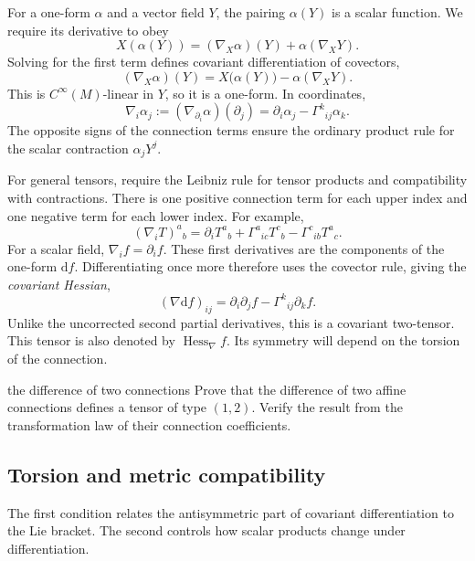 \documentclass[11pt,a4paper]{article}
\numberwithin{equation}{section}
\newcommand{\dd}{\mathrm d}
\newcommand{\Cinf}{C^\infty}
\begin{document}
For a one-form \(\alpha\) and a vector field \(Y\), the pairing
\(\alpha(Y)\) is a scalar function. We require its derivative to obey
\[
 X(\alpha(Y))=(\nabla_X\alpha)(Y)+\alpha(\nabla_XY).
\]
Solving for the first term defines covariant differentiation of covectors,
\[
 (\nabla_X\alpha)(Y)
 =X\bigl(\alpha(Y)\bigr)-\alpha(\nabla_XY).
\]
This is \(\Cinf(M)\)-linear in \(Y\), so it is a one-form. In coordinates,
\begin{equation}
 \nabla_i\alpha_j:=
 (\nabla_{\partial_i}\alpha)(\partial_j)
 =\partial_i\alpha_j-\Gamma^k{}_{ij}\alpha_k.
 \label{eq:covariant-covector}
\end{equation}
The opposite signs of the connection terms ensure the ordinary product rule
for the scalar contraction \(\alpha_jY^j\).

For general tensors, require the Leibniz rule for tensor products and
compatibility with contractions. There is one positive connection term for
each upper index and one negative term for each lower index. For example,
\[
 (\nabla_i T)^a{}_b
 =\partial_iT^a{}_b+\Gamma^a{}_{ic}T^c{}_b
  -\Gamma^c{}_{ib}T^a{}_c.
\]
For a scalar field, \(\nabla_i f=\partial_i f\). These first derivatives
are the components of the one-form \(\dd f\). Differentiating once more
therefore uses the covector rule, giving the \emph{covariant Hessian},
\begin{equation}
 (\nabla\dd f)_{ij}
 =\partial_i\partial_j f-\Gamma^k{}_{ij}\partial_k f.
 \label{eq:hessian}
\end{equation}
Unlike the uncorrected second partial derivatives, this is a covariant
two-tensor. This tensor is also denoted by \(\operatorname{Hess}_\nabla f\).
Its symmetry will depend on the torsion of the connection.


\begin{studentwork}[3.6cm]{the difference of two connections}
Prove that the difference of two affine connections defines a tensor
of type \((1,2)\). Verify the result from the transformation law of
their connection coefficients.
\end{studentwork}

\subsection{Torsion and metric compatibility}

The first condition relates the antisymmetric part of covariant
differentiation to the Lie bracket. The second controls how scalar
products change under differentiation.
\end{document}
